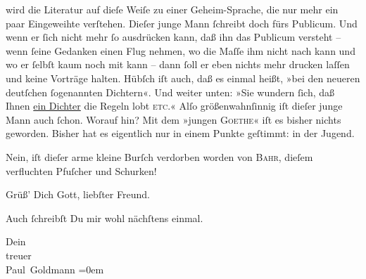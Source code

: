                wird die Literatur auf dieſe Weiſe zu einer Geheim-Sprache, die nur mehr ein paar
               Eingeweihte verſtehen. Dieſer junge Mann ſchreibt doch fürs Publicum. Und wenn er ſich nicht mehr
               ſo ausdrücken kann, daß ihn das Publicum versteht – wenn ſeine Gedanken einen Flug
               nehmen, {\pb}wo die Maſſe ihm nicht nach kann und wo er
               ſelbſt kaum noch mit kann – dann ſoll er eben  nichts mehr drucken laſſen und keine Vorträge halten. Hübſch iſt auch, daß es
               einmal heißt, »bei den neueren
                  deutſchen ſogenannten Dichtern«. Und weiter unten: »Sie wundern ſich, daß Ihnen \uline{ein Dichter} die Regeln lobt \textsc{etc.}« Alſo größenwahnſinnig {\pb}iſt dieſer junge Mann auch ſchon. Worauf hin?
               Mit dem »jungen \textsc{Goethe}« iſt es bisher nichts geworden. Bisher hat es eigentlich nur in einem Punkte
               geſtimmt: in der Jugend.\pend
           
\pstart
           Nein, iſt dieſer arme kleine Burſch verdorben worden\strikeout{!} von \textsc{Bahr}, dieſem verfluchten Pfuſcher und Schurken!\pend
           
\pstart
           {\pb}Grüß’ Dich Gott, liebſter Freund.\pend
           
\pstart
           Auch ſchreibſt Du mir wohl nächſtens einmal.\pend
           
\pstart
           Dein {\\[\baselineskip]}treuer {\\[\baselineskip]}\spacefill\mbox{Paul Goldmann}\pend
           \leftskip=0em{}\endnumbering{}  
      
